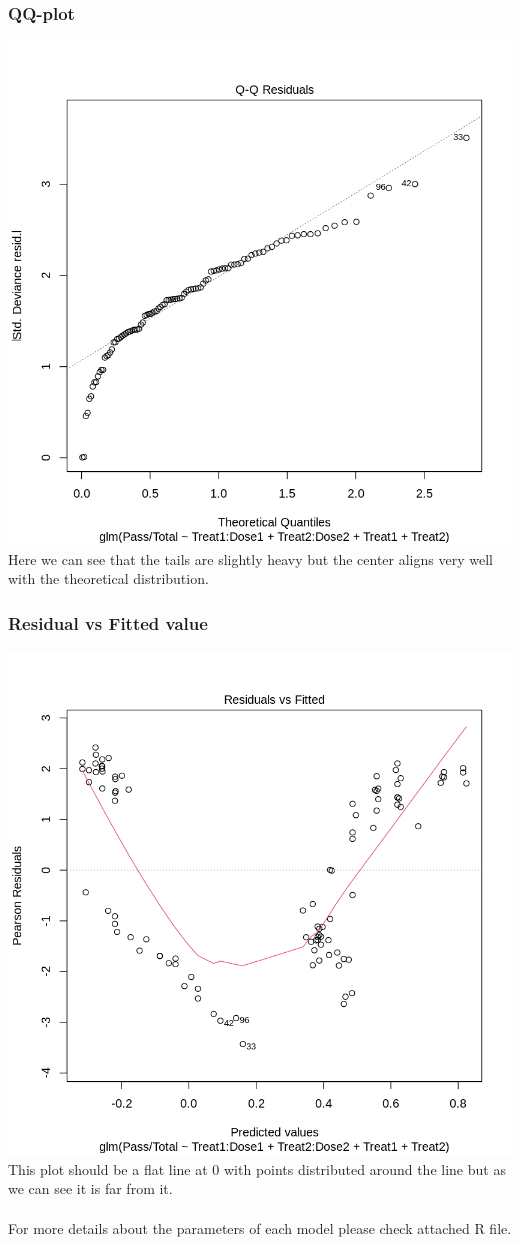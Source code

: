 \documentclass{article}
\begin{document}
\subsubsection{QQ-plot}
\includegraphics[width = \textwidth]{QQplot.png}
Here we can see that the tails are slightly heavy but the center
aligns very well with the theoretical distribution.

\subsubsection{Residual vs Fitted value}
\includegraphics[width=\textwidth]{resvsfit.png}
This plot should be a flat line at 0 with points distributed around
the line but as we can see it is far from it.
\\
\\
For more details about the parameters of each model please check attached
R file.
\end{document}
